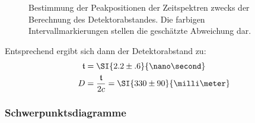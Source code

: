 \documentclass[slug=PET, room=Andreas-Schubert-Bau\,\ 424A, supervisor=Carsten\ Bittrich, coursedate=10.\ 01.\ 2020]{../../Lab_Report_LaTeX/lab_report}
\begin{document}
\begin{figure}[H]\centering
  
  \caption[Abstandsbestimmung]{Bestimmung der Peakpositionen der Zeitspektren zwecks der
    Berechnung des Detektorabstandes. Die farbigen Intervallmarkierungen
    stellen die gesch\"atzte Abweichung dar.}
  \label{fig:calibration-lenght_det}
\end{figure}

Entsprechend ergibt sich dann der Detektorabstand zu:
\begin{align}
  \label{eq:abst}
  \mathfrak{t} &= \SI{2.2\pm .6}{\nano\second} \\
  D &= \frac{\mathfrak{t}}{2c} = \SI{330\pm 90}{\milli\meter}
\end{align}

\subsubsection{Schwerpunktsdiagramme}
\label{sec:schwpkt}
\end{document}
